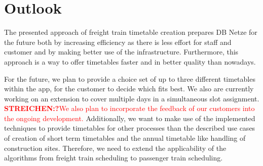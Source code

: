 \section{Outlook}
\label{chap:outlook}
The presented approach of freight train timetable creation prepares DB Netze for the future both by increasing efficiency as there is less effort for staff and customer and by making better use of the infrastructure. Furthermore, this approach is a way to offer timetables faster and in better quality than nowadays.

For the future, we plan to provide a choice set of up to three different timetables within the app, for the customer to decide which fits best. We also are currently working on an extension to cover multiple days in a simultaneous slot assignment. \textcolor{red}{\textbf{STREICHEN:?}We also plan to incorporate the feedback of our customers into the ongoing development.}
Additionally, we want to make use of the implemented techniques to provide timetables for other processes than the described use cases of creation of short term timetables and the annual timetable like handling of construction sites. Therefore, we need to extend the applicability of the algorithms from freight train scheduling to passenger train scheduling.